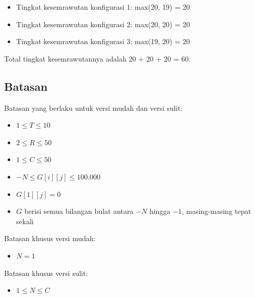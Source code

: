 \documentclass[../main_problemset.tex]{subfiles} %
\begin{document}
\begin{itemize}
	\item Tingkat kesemrawutan konfigurasi 1: max(20, 19) = 20
	\item Tingkat kesemrawutan konfigurasi 2: max(20, 20) = 20
	\item Tingkat kesemrawutan konfigurasi 3: max(19, 20) = 20
\end{itemize}

Total tingkat kesemrawutannya adalah 20 + 20 + 20 = 60.

\subsection*{Batasan}

Batasan yang berlaku untuk versi mudah dan versi sulit:

\begin{itemize}
	\item $ 1 \le T \le 10 $
	\item $ 2 \le R \le 50 $
	\item $ 1 \le C \le 50 $
	\item $ -N \le G[i][j] \le 100.000 $
	\item $ G[1][j] = 0 $
	\item $ G $ berisi semua bilangan bulat antara $ -N $ hingga $ -1 $, masing-masing tepat sekali
\end{itemize}

Batasan khusus versi mudah:

\begin{itemize}
	\item $ N = 1 $
\end{itemize}

Batasan khusus versi sulit:

\begin{itemize}
	\item $1 \le N \le C$
\end{itemize}
\end{document}
